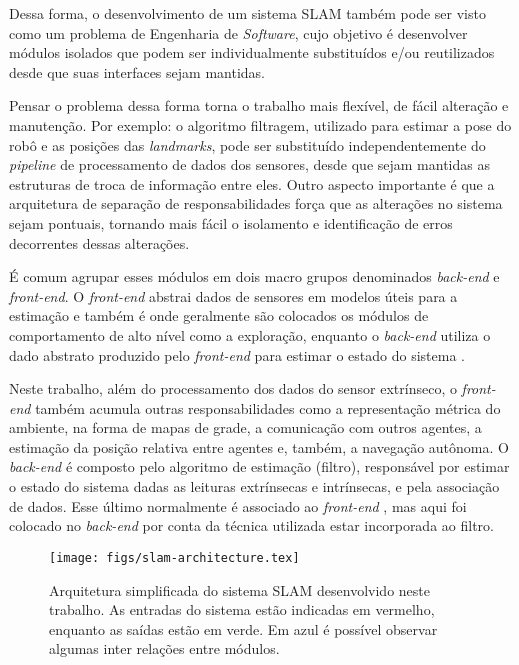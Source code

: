 Dessa forma, o desenvolvimento de 
um sistema SLAM também pode ser visto como um problema de Engenharia de
\textit{Software}, cujo objetivo é desenvolver módulos isolados que podem 
ser individualmente substituídos e/ou reutilizados desde que suas interfaces 
sejam mantidas.

Pensar o problema dessa forma torna o trabalho mais flexível, de fácil alteração e manutenção. 
Por exemplo: o algoritmo filtragem, utilizado para estimar a pose do robô e as 
posições das \textit{landmarks}, pode ser substituído independentemente do 
\textit{pipeline} de processamento de dados dos sensores, desde que sejam 
mantidas as estruturas de troca de informação entre eles. 
Outro aspecto importante é que a arquitetura de separação de 
responsabilidades força que as alterações no sistema sejam pontuais, 
tornando mais fácil o isolamento e identificação de erros decorrentes 
dessas alterações.

É comum agrupar esses módulos em dois macro grupos denominados 
\textit{back-end} e \textit{front-end}. O \textit{front-end} abstrai dados de 
sensores em modelos úteis para a estimação e também é onde geralmente são colocados os módulos de comportamento de alto nível como a exploração, enquanto o \textit{back-end} utiliza 
o dado abstrato produzido pelo \textit{front-end} para estimar o estado do 
sistema \cite{cadena2016past}.

Neste trabalho, além do processamento dos dados do sensor extrínseco, o 
\textit{front-end} também acumula outras responsabilidades como a representação 
métrica do ambiente, na forma de mapas de grade, a comunicação com outros 
agentes, a estimação da posição relativa entre agentes e, também, a navegação 
autônoma. O \textit{back-end} é composto pelo algoritmo de estimação (filtro), 
responsável por estimar o estado do sistema dadas as leituras extrínsecas e intrínsecas, e pela associação de dados. Esse último normalmente é 
associado ao \textit{front-end} \cite[]{cadena2016past}, mas aqui foi 
colocado no \textit{back-end} por conta da técnica utilizada estar 
incorporada ao filtro.

\begin{figure}[h]
  \centering
  \texttt{[image: figs/slam-architecture.tex]}
  \caption[Arquitetura simplificada do sistema SLAM desenvolvido]{Arquitetura simplificada do sistema SLAM desenvolvido neste trabalho. As entradas do sistema estão indicadas em vermelho, enquanto as saídas estão em verde. Em azul é 
  possível observar algumas inter relações entre módulos.}
  \label{fig:slam-architecture}
\end{figure}

